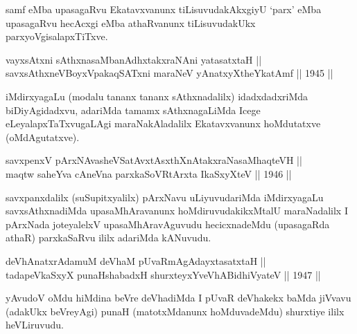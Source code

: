 \begin{artha}
samf eMba upasagaRvu Ekatavxvanunx tiLisuvudakAkxgiyU `parx' eMba
upasagaRvu hecAcxgi eMba athaRvanunx tiLisuvudakUkx
parxyoVgisalapxTiTxve.
\end{artha}


\begin{shl}
vayxsAtxni sAthxnasaMbanAdhxtakxraNAni yatasatxtaH || \\
savxsAthxneVBoyxV\s pakaqSATxni maraNeV yAnatxyXtheYkatAmf \hfill || 1945 ||
  
\end{shl}

\begin{artha}
iMdirxyagaLu (modalu tananx tananx sAthxnadalilx) idadxdadxriMda
biDiyAgidadxvu, adariMda tamamx sAthxnagaLiMda Icege
eLeyalapxTaTxvugaLAgi maraNakAladalilx Ekatavxvanunx hoMdutatxve
(oMdAgutatxve).
\end{artha}


\begin{shl}
savxpenxV pArxNAvasheVSatAvxtAsxthXnAtakxraNasaMhaqteVH || \\
maqtw saheYva cAneVna parxkaSoVR\s tArxta IkaSxyXteV \hfill || 1946 ||
  
\end{shl}

\begin{artha}
savxpanxdalilx (suSupitxyalilx) pArxNavu uLiyuvudariMda iMdirxyagaLu
savxsAthxnadiMda upasaMhAravanunx hoMdiruvudakikxMtalU maraNadalilx I
pArxNada joteyalelxV upasaMhAravAguvudu hecicxnadeMdu (upasagaRda
athaR) parxkaSaRvu ililx adariMda kANuvudu.
\end{artha}


\begin{shl}
deVhAnatxrAdamuM deVhaM pUvaRmAgAdayxtasatxtaH || \\
tadapeVkaSxyX punaHshabadxH shurxteyxYveVhABidhiVyateV \hfill || 1947 ||
  
\end{shl}

\begin{artha}
yAvudoV oMdu hiMdina beVre deVhadiMda I pUvaR deVhakekx baMda jiVvavu (adakUkx beVreyAgi) punaH (matotxMdanunx hoMduvadeMdu) shurxtiye ililx heVLiruvudu.
\end{artha}

